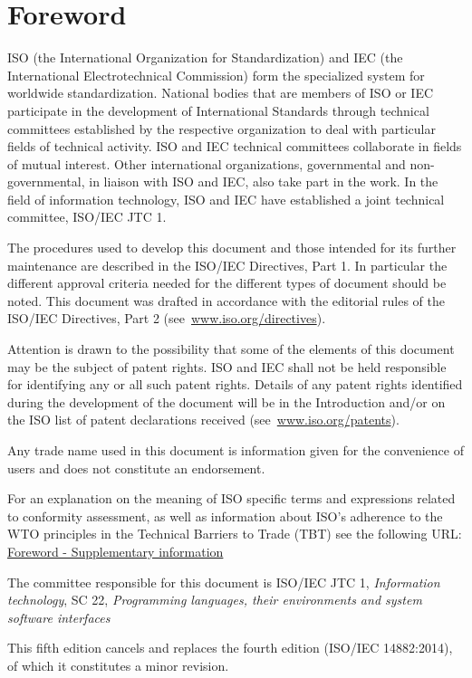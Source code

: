 \chapter{Foreword}

ISO (the International Organization for Standardization) and IEC (the
International Electrotechnical Commission) form the specialized system for
worldwide standardization. National bodies that are members of ISO or IEC
participate in the development of International Standards through technical
committees established by the respective organization to deal with particular
fields of technical activity. ISO and IEC technical committees collaborate in
fields of mutual interest. Other international organizations, governmental and
non-governmental, in liaison with ISO and IEC, also take part in the work. In
the field of information technology, ISO and IEC have established a joint
technical committee, ISO/IEC JTC 1.

The procedures used to develop this document and those intended for its further
maintenance are described in the ISO/IEC Directives, Part 1. In particular the
different approval criteria needed for the different types of document should
be noted. This document was drafted in accordance with the editorial rules of
the ISO/IEC Directives, Part 2
(see~\href{http://www.iso.org/directives}{www.iso.org/directives}).

Attention is drawn to the possibility that some of the elements of this
document may be the subject of patent rights. ISO and IEC shall not be held
responsible for identifying any or all such patent rights.  Details of any
patent rights identified during the development of the document will be in the
Introduction and/or on the ISO list of patent declarations received
(see~\href{http://www.iso.org/patents}{www.iso.org/patents}).

Any trade name used in this document is information given for the convenience
of users and does not constitute an endorsement.

For an explanation on the meaning of ISO specific terms and expressions related
to conformity assessment, as well as information about ISO's adherence to the
WTO principles in the Technical Barriers to Trade (TBT) see the following URL:
\href{http://www.iso.org/iso/home/standards_development/resources-for-technical-work/foreword.htm}{Foreword - Supplementary information}

The committee responsible for this document is
ISO/IEC JTC 1, \textit{Information technology},
SC 22, \textit{Programming languages, their environments and system software interfaces}

This fifth edition cancels and replaces the fourth edition
(ISO/IEC 14882:2014), of which it constitutes a minor revision.
